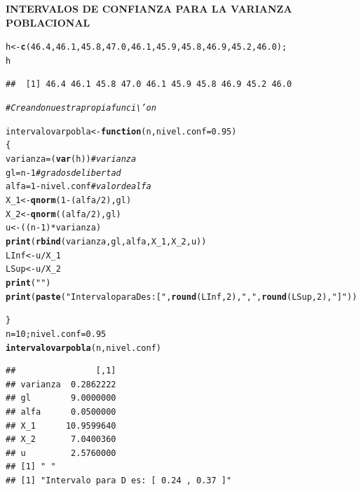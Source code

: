 \documentclass[12pt,letterpaper]{article}\usepackage[]{graphicx}\usepackage[]{color}
\makeatletter
\newcommand{\hlnum}[1]{\textcolor[rgb]{0.686,0.059,0.569}{#1}}%
\newcommand{\hlstr}[1]{\textcolor[rgb]{0.192,0.494,0.8}{#1}}%
\newcommand{\hlcom}[1]{\textcolor[rgb]{0.678,0.584,0.686}{\textit{#1}}}%
\newcommand{\hlopt}[1]{\textcolor[rgb]{0,0,0}{#1}}%
\newcommand{\hlstd}[1]{\textcolor[rgb]{0.345,0.345,0.345}{#1}}%
\newcommand{\hlkwa}[1]{\textcolor[rgb]{0.161,0.373,0.58}{\textbf{#1}}}%
\newcommand{\hlkwb}[1]{\textcolor[rgb]{0.69,0.353,0.396}{#1}}%
\newcommand{\hlkwc}[1]{\textcolor[rgb]{0.333,0.667,0.333}{#1}}%
\newcommand{\hlkwd}[1]{\textcolor[rgb]{0.737,0.353,0.396}{\textbf{#1}}}%
\newenvironment{kframe}{%
 \def\at@end@of@kframe{}%
 \ifinner\ifhmode%
  \def\at@end@of@kframe{\end{minipage}}%
  \begin{minipage}{\columnwidth}%
 \fi\fi%
 \def\FrameCommand##1{\hskip\@totalleftmargin \hskip-\fboxsep
 \colorbox{shadecolor}{##1}\hskip-\fboxsep
     \hskip-\linewidth \hskip-\@totalleftmargin \hskip\columnwidth}%
 \MakeFramed {\advance\hsize-\width
   \@totalleftmargin\z@ \linewidth\hsize
   \@setminipage}}%
 {\par\unskip\endMakeFramed%
 \at@end@of@kframe}
\newenvironment{knitrout}{}{} %
\makeatother
\begin{document}
\begin{center}
\textbf{INTERVALOS DE CONFIANZA PARA LA VARIANZA POBLACIONAL}
\end{center}

\begin{knitrout}
\color{fgcolor}\begin{kframe}
\begin{alltt}
\hlstd{h} \hlkwb{<-} \hlkwd{c} \hlstd{(}\hlnum{46.4}\hlstd{,} \hlnum{46.1}\hlstd{,} \hlnum{45.8}\hlstd{,} \hlnum{47.0}\hlstd{,} \hlnum{46.1}\hlstd{,} \hlnum{45.9}\hlstd{,} \hlnum{45.8}\hlstd{,} \hlnum{46.9}\hlstd{,} \hlnum{45.2}\hlstd{,} \hlnum{46.0}\hlstd{);}
\hlstd{h}
\end{alltt}
\begin{verbatim}
##  [1] 46.4 46.1 45.8 47.0 46.1 45.9 45.8 46.9 45.2 46.0
\end{verbatim}
\begin{alltt}
\hlcom{# Creando nuestra propia funci\textbackslash{}'on}

\hlstd{intervalovarpobla} \hlkwb{<-} \hlkwa{function}\hlstd{(}\hlkwc{n}\hlstd{,} \hlkwc{nivel.conf}\hlstd{=}\hlnum{0.95}\hlstd{)}
\hlstd{\{}
  \hlstd{varianza} \hlkwb{=} \hlstd{(}\hlkwd{var}\hlstd{(h))} \hlcom{# varianza}
  \hlstd{gl} \hlkwb{=} \hlstd{n} \hlopt{-} \hlnum{1} \hlcom{# grados de libertad}
  \hlstd{alfa} \hlkwb{=} \hlnum{1} \hlopt{-} \hlstd{nivel.conf} \hlcom{# valor de alfa}
  \hlstd{X_1} \hlkwb{<-} \hlkwd{qnorm}\hlstd{(}\hlnum{1}\hlopt{-}\hlstd{(alfa}\hlopt{/}\hlnum{2}\hlstd{), gl)}
  \hlstd{X_2} \hlkwb{<-} \hlkwd{qnorm}\hlstd{((alfa}\hlopt{/}\hlnum{2}\hlstd{), gl)}
  \hlstd{u} \hlkwb{<-} \hlstd{((n} \hlopt{-} \hlnum{1}\hlstd{)}\hlopt{*}\hlstd{varianza)}
  \hlkwd{print}\hlstd{(}\hlkwd{rbind}\hlstd{(varianza, gl, alfa, X_1, X_2, u))}
  \hlstd{LInf} \hlkwb{<-} \hlstd{u}\hlopt{/}\hlstd{X_1}
  \hlstd{LSup} \hlkwb{<-} \hlstd{u}\hlopt{/}\hlstd{X_2}
\hlkwd{print}\hlstd{(}\hlstr{" "}\hlstd{)}
  \hlkwd{print}\hlstd{(}\hlkwd{paste}\hlstd{(}\hlstr{"Intervalo para D es: ["}\hlstd{,} \hlkwd{round}\hlstd{(LInf,} \hlnum{2}\hlstd{),} \hlstr{","}\hlstd{,} \hlkwd{round}\hlstd{(LSup,} \hlnum{2}\hlstd{),} \hlstr{"]"}\hlstd{))}

\hlstd{\}}
 \hlstd{n}\hlkwb{=}\hlnum{10}\hlstd{; nivel.conf}\hlkwb{=}\hlnum{0.95}
\hlkwd{intervalovarpobla} \hlstd{( n, nivel.conf)}
\end{alltt}
\begin{verbatim}
##                [,1]
## varianza  0.2862222
## gl        9.0000000
## alfa      0.0500000
## X_1      10.9599640
## X_2       7.0400360
## u         2.5760000
## [1] " "
## [1] "Intervalo para D es: [ 0.24 , 0.37 ]"
\end{verbatim}
\end{kframe}
\end{knitrout}
\end{document}
